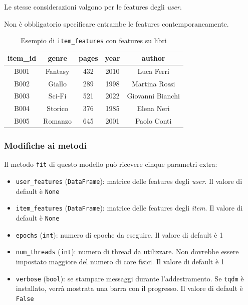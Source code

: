 Le stesse considerazioni valgono per le features degli \textit{user}.

Non è obbligatorio specificare entrambe le features contemporaneamente.

\begin{table}[H]
    \centering
    \begin{tabular}{|c|c|c|c|c|}
    \hline
    \textbf{item\_id} & \textbf{genre} & \textbf{pages} & \textbf{year} & \textbf{author} \\
    \hline
    B001 & Fantasy       & 432 & 2010 & Luca Ferri       \\
    B002 & Giallo        & 289 & 1998 & Martina Rossi     \\
    B003 & Sci-Fi        & 521 & 2022 & Giovanni Bianchi  \\
    B004 & Storico       & 376 & 1985 & Elena Neri        \\
    B005 & Romanzo       & 645 & 2001 & Paolo Conti       \\
    \hline
    \end{tabular}
    \caption{Esempio di \texttt{item\_features} con features su libri}
    \label{tab:book_metadata}
\end{table}

\subsubsection{Modifiche ai metodi}

Il metodo \texttt{fit} di questo modello può ricevere cinque parametri extra:

\begin{itemize}
    \item \texttt{user\_features} (\texttt{DataFrame}): matrice delle features degli \textit{user}. Il valore di default è \texttt{None}
    \item \texttt{item\_features} (\texttt{DataFrame}): matrice delle features degli \textit{item}. Il valore di default è \texttt{None}
    \item \texttt{epochs} (\texttt{int}): numero di epoche da eseguire. Il valore di default è 1
    \item \texttt{num\_threads} (\texttt{int}): numero di thread da utilizzare. Non dovrebbe essere impostato maggiore del numero di core fisici. Il valore di default è 1
    \item \texttt{verbose} (\texttt{bool}): se stampare messaggi durante l'addestramento. Se \texttt{tqdm} è installato, verrà mostrata una barra con il progresso. Il valore di default è \texttt{False}
\end{itemize}

